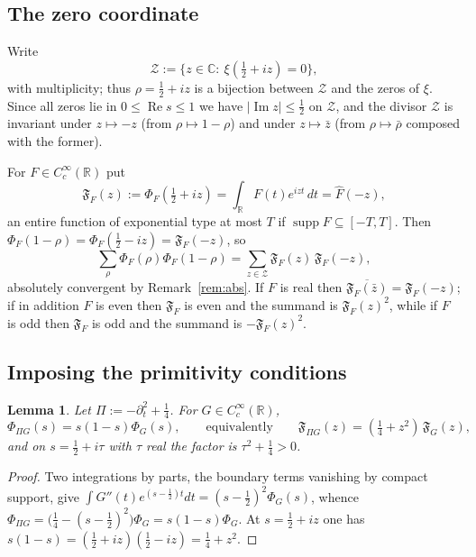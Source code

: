 \documentclass[11pt]{amsart}
\newtheorem{lemma}[theorem]{Lemma}
\theoremstyle{definition}
\theoremstyle{remark}
\newcommand{\C}{\mathbb C}
\newcommand{\R}{\mathbb R}
\newcommand{\Rel}{\operatorname{Re}}
\newcommand{\Iml}{\operatorname{Im}}
\newcommand{\supp}{\operatorname{supp}}
\begin{document}
\subsection{The zero coordinate}

Write
\begin{equation}
  \mathcal Z:=\{z\in\C:\ \xi(\tfrac12+iz)=0\},
\tag{11.1}
\end{equation}
with multiplicity; thus $\rho=\tfrac12+iz$ is a bijection between $\mathcal Z$
and the zeros of $\xi$.  Since all zeros lie in $0\le\Rel s\le1$ we have
$|\Iml z|\le\tfrac12$ on $\mathcal Z$, and the divisor $\mathcal Z$ is
invariant under $z\mapsto-z$ (from $\rho\mapsto1-\rho$) and under
$z\mapsto\bar z$ (from $\rho\mapsto\bar\rho$ composed with the former).

For $F\in C_c^\infty(\R)$ put
\begin{equation}
  \mathfrak F_F(z):=\Phi_F(\tfrac12+iz)=\int_\R F(t)e^{izt}\,dt=\hat F(-z),
\tag{11.2}
\end{equation}
an entire function of exponential type at most $T$ if $\supp F\subseteq[-T,T]$.
Then $\Phi_F(1-\rho)=\Phi_F(\tfrac12-iz)=\mathfrak F_F(-z)$, so
\begin{equation}
  \sum_\rho\Phi_F(\rho)\Phi_F(1-\rho)
  =\sum_{z\in\mathcal Z}\mathfrak F_F(z)\,\mathfrak F_F(-z),
\tag{11.3}
\end{equation}
absolutely convergent by Remark~\ref{rem:abs}.  If $F$ is real then
$\overline{\mathfrak F_F(\bar z)}=\mathfrak F_F(-z)$; if in addition $F$ is
even then $\mathfrak F_F$ is even and the summand is $\mathfrak F_F(z)^2$,
while if $F$ is odd then $\mathfrak F_F$ is odd and the summand is
$-\mathfrak F_F(z)^2$.

\subsection{Imposing the primitivity conditions}

\begin{lemma}
\label{lem:Pi}
Let $\Pi:=-\partial_t^2+\tfrac14$.  For $G\in C_c^\infty(\R)$,
\[
  \Phi_{\Pi G}(s)=s(1-s)\Phi_G(s),
  \qquad\text{equivalently}\qquad
  \mathfrak F_{\Pi G}(z)=(\tfrac14+z^2)\,\mathfrak F_G(z),
\]
and on $s=\tfrac12+i\tau$ with $\tau$ real the factor is $\tau^2+\tfrac14>0$.
\end{lemma}

\begin{proof}
Two integrations by parts, the boundary terms vanishing by compact support,
give $\int G''(t)e^{(s-\frac12)t}dt=(s-\tfrac12)^2\Phi_G(s)$, whence
$\Phi_{\Pi G}=\bigl(\tfrac14-(s-\tfrac12)^2\bigr)\Phi_G=s(1-s)\Phi_G$.  At
$s=\tfrac12+iz$ one has $s(1-s)=(\tfrac12+iz)(\tfrac12-iz)=\tfrac14+z^2$.
\end{proof}
\end{document}
